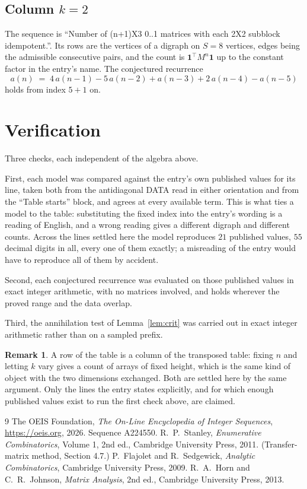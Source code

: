 \documentclass[11pt,a4paper]{article}
\theoremstyle{plain}
\theoremstyle{definition}
\newtheorem{remark}[theorem]{Remark}
\begin{document}
\subsection*{Column $k$$=2$}
The sequence is ``Number of (n+1)X3 0..1 matrices with each 2X2 subblock idempotent.''. Its rows are the vertices of a digraph on
$S=8$ vertices, edges being the admissible consecutive pairs, and the count is
$\mathbf{1}^{\!\top}M^{n}\mathbf{1}$ up to the constant factor in the entry's name.
The conjectured recurrence
\[
a(n)\;=\;4\,a(n-1) - 5\,a(n-2) + a(n-3) + 2\,a(n-4) - a(n-5)
\]
holds from index $5+1$ on.

\section{Verification}

Three checks, each independent of the algebra above.

First, each model was compared against the entry's own published values for its line, taken
both from the antidiagonal DATA read in either orientation and from the ``Table starts''
block, and agrees at every available term. This is what ties a model to the table:
substituting the fixed index into the entry's wording is a reading of English, and a wrong
reading gives a different digraph and different counts. Across the lines settled here the
model reproduces $21$ published values, $55$ decimal digits in all, every one of
them exactly; a misreading of the entry would have to reproduce all of them by accident.

Second, each conjectured recurrence was evaluated on those published values in exact
integer arithmetic, with no matrices involved, and holds wherever the proved range and the
data overlap.

Third, the annihilation test of Lemma~\ref{lem:crit} was carried out in exact integer
arithmetic rather than on a sampled prefix.

\begin{remark}
A row of the table is a column of the transposed table: fixing $n$ and letting $k$ vary gives a
count of arrays of fixed height, which is the same kind of object with the two dimensions
exchanged. Both are settled here by the same argument. Only the lines the entry states
explicitly, and for which enough published values exist to run the first check above, are
claimed.
\end{remark}

\begin{thebibliography}{9}
 The OEIS Foundation, \emph{The On-Line Encyclopedia of Integer
Sequences}, \url{https://oeis.org}, 2026. Sequence A224550.
 R.~P.~Stanley, \emph{Enumerative Combinatorics}, Volume 1, 2nd ed.,
Cambridge University Press, 2011. (Transfer-matrix method, Section 4.7.)
 P.~Flajolet and R.~Sedgewick, \emph{Analytic Combinatorics}, Cambridge
University Press, 2009.
 R.~A.~Horn and C.~R.~Johnson, \emph{Matrix Analysis}, 2nd ed., Cambridge
University Press, 2013.
\end{thebibliography}
\end{document}
